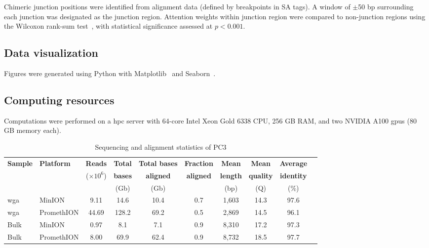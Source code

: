 \documentclass[pdflatex,sn-nature,lineno]{sn-jnl}%
\theoremstyle{thmstyleone}%
\theoremstyle{thmstyletwo}%
\theoremstyle{thmstylethree}%
\begin{document}
Chimeric junction positions were identified from alignment data (defined by breakpoints in SA tags).
A window of $\pm$50 bp surrounding each junction was designated as the junction region. Attention weights within junction region were compared to non-junction regions using the Wilcoxon rank-sum test~\cite{2020SciPy-NMeth}, with statistical significance assessed at $p < 0.001$.

\subsection*{Data visualization}
Figures were generated using Python with Matplotlib~\cite{Hunter2007} and Seaborn~\cite{Waskom2021}.

\subsection*{Computing resources}
Computations were performed on a \gls{hpc} server with 64-core Intel Xeon Gold 6338 CPU, 256 GB RAM, and two NVIDIA A100 \glspl{gpu} (80 GB memory each).

\backmatter


\makeatletter
\renewcommand{\theHfigure}{extended.\thefigure}
\renewcommand{\theHtable}{extended.\thetable}
\makeatother

\renewcommand{\figurename}{Extended Data Fig.}
\renewcommand{\tablename}{Extended Data Table}
\setcounter{figure}{0}
\setcounter{table}{0}

\begin{table}[!ht]
\centering
\caption{Sequencing and alignment statistics of PC3}
\label{tab:seq_stats}
\small
\setlength{\tabcolsep}{3pt} %
\begin{tabular}{@{}llcccccccc@{}}
\toprule
\textbf{Sample} & \textbf{Platform} & \textbf{Reads} & \textbf{Total} & \textbf{Total bases} & \textbf{Fraction} & \textbf{Mean} & \textbf{Mean} & \textbf{Average}\\
 & & ($\times 10^6$) & \textbf{bases} & \textbf{aligned} & \textbf{aligned} & \textbf{length} & \textbf{quality} & \textbf{identity}  \\
 & & & (Gb) & (Gb) & & (bp) & (Q) & (\%) \\
\midrule
\gls{wga} & MinION & 9.11 & 14.6 & 10.4 & 0.7 & 1,603 & 14.3 & 97.6 \\
\gls{wga} & PromethION & 44.69 & 128.2 & 69.2 & 0.5 & 2,869 & 14.5 & 96.1 \\
Bulk & MinION & 0.97 & 8.1 & 7.1 & 0.9 & 8,310 & 17.2 & 97.3 \\
Bulk & PromethION & 8.00 & 69.9 & 62.4 & 0.9 & 8,732 & 18.5 & 97.7 \\
\bottomrule
\end{tabular}
\end{table}
\end{document}
